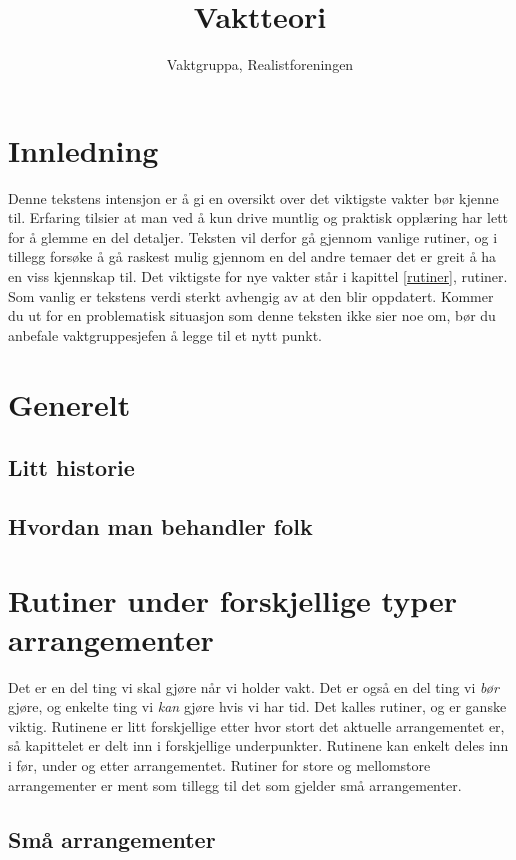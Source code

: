 \documentclass[11pt,norsk,a4paper]{article}
\title{Vaktteori}
\author{Vaktgruppa, Realistforeningen}
\begin{document}
\maketitle

\section{Innledning}

Denne tekstens intensjon er å gi en oversikt over det viktigste vakter bør kjenne til. Erfaring tilsier at man ved å kun drive muntlig og praktisk opplæring har lett for å glemme en del detaljer. Teksten vil derfor gå gjennom vanlige rutiner, og i tillegg forsøke å gå raskest mulig gjennom en del andre temaer det er greit å ha en viss kjennskap til. Det viktigste for nye vakter står i kapittel \vref{rutiner}, rutiner. Som vanlig er tekstens verdi sterkt avhengig av at den blir oppdatert. Kommer du ut for en problematisk situasjon som denne teksten ikke sier noe om, bør du anbefale vaktgruppesjefen å legge til et nytt punkt.

\section{Generelt}
\subsection{Litt historie}

\subsection{Hvordan man behandler folk}

\section{Rutiner under forskjellige typer arrangementer} \label{rutiner}

Det er en del ting vi skal gjøre når vi holder vakt. Det er også en del ting vi \textit{bør} gjøre, og enkelte ting vi \textit{kan} gjøre hvis vi har tid. Det kalles rutiner, og er ganske viktig. Rutinene er litt forskjellige etter hvor stort det aktuelle arrangementet er, så kapittelet er delt inn i forskjellige underpunkter. Rutinene kan enkelt deles inn i før, under og etter arrangementet. Rutiner for store og mellomstore arrangementer er ment som tillegg til det som gjelder små arrangementer.

\subsection{Små arrangementer}
\end{document}
